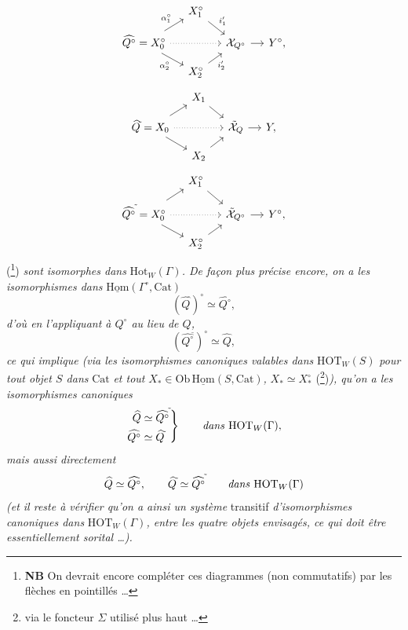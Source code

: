 \documentclass[11pt]{article}
\newcommand{\printedpage}[1]{\marginpar{\footnotesize p.~#1}}
\newcommand{\msp}[1]{\marginpar{\footnotesize [#1]}}
\newcommand{\Cat}{\mathrm{Cat}}
\newcommand{\uHom}{\underline{\mathrm{Hom}}}
\newcommand{\HOT}{\mathrm{HOT}}
\newcommand{\Hot}{\mathrm{Hot}}
\newcommand{\tld}{^{\tilde{}}}
\begin{document}
\setcounter{footnote}{90}

\printedpage{98}
\[
\begin{tikzcd}[row sep=small, column sep=small]
 & X_1^\circ \arrow[dr,"i^{\prime}_{1}"] & & \\
\widehat{Q^\circ} = X_0^\circ \arrow[ur,"\alpha_1^\circ"] \arrow[dr,"\alpha_2^\circ"'] \arrow[rr,dotted] & & \mathcal{X}_{Q^\circ} \arrow[r] & Y^\circ, \\
 & X_2^\circ \arrow[ur,"i^{\prime}_{2}"'] & &
\end{tikzcd}
\]
\[
\begin{tikzcd}[row sep=small, column sep=small]
 & X_1 \arrow[dr] & & \\
\widehat{Q}\tld = X_0 \arrow[ur] \arrow[dr] \arrow[rr,dotted] & & \tilde{\mathcal{X}}_{Q} \arrow[r] & Y, \\
 & X_2 \arrow[ur] & &
\end{tikzcd}
\]
\[
\begin{tikzcd}[row sep=small, column sep=small]
 & X_1^\circ \arrow[dr] & & \\
\widehat{Q^\circ}\tld = X_0^\circ \arrow[ur] \arrow[dr] \arrow[rr,dotted] & & \tilde{\mathcal{X}}_{Q^\circ} \arrow[r] & Y^\circ, \\
 & X_2^\circ \arrow[ur] & &
\end{tikzcd}
\]
(\footnote{\textbf{NB} On devrait encore compléter ces diagrammes (non commutatifs) par les flèches en pointillés \dots}) \textit{sont isomorphes dans} $\Hot_W(\Gamma)$\textit{. De façon plus précise encore, on a les isomorphismes dans} $\uHom(\Gamma^\circ,\Cat)$
\[
(\widehat{Q}\tld)^\circ \simeq \widehat{Q^\circ},
\]
\textit{d'où en l'appliquant à $Q^\circ$ au lieu de $Q$,}
\[
(\widehat{Q^\circ}\tld)^\circ \simeq \widehat{Q},
\]
\textit{ce qui implique (via les isomorphismes canoniques valables dans} $\HOT_W(S)$ \textit{pour tout objet $S$ dans} $\Cat$ \textit{et tout} $X_* \in \mathrm{Ob}\,\uHom(S,\Cat)$\textit{,} $X_* \simeq X_*^\circ$ (\footnote{via le foncteur $\Sigma$ utilisé plus haut \dots})\textit{), qu'on a les isomorphismes canoniques}
\[
\left.\begin{aligned}
\widehat{Q} &\simeq \widehat{Q^\circ}\tld \\
\widehat{Q^\circ} &\simeq \widehat{Q}\tld
\end{aligned}\right\}
\qquad \text{\textit{dans} } \HOT_W(\Gamma),
\]
\textit{mais aussi directement}
\[
\widehat{Q} \simeq \widehat{Q^\circ}, \qquad \widehat{Q}\tld \simeq \widehat{Q^\circ}\tld \qquad \text{\textit{dans} } \HOT_W(\Gamma)
\]
\msp{page 143}\textit{(et il reste à vérifier qu'on a ainsi un système} transitif \textit{d'isomorphismes canoniques dans} $\HOT_W(\Gamma)$\textit{, entre les quatre objets envisagés, ce qui doit être essentiellement sorital \dots).}
\end{document}
